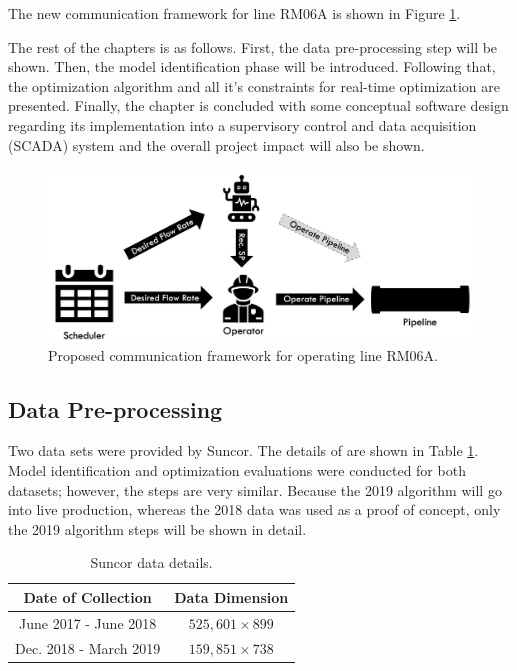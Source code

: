 The new communication framework for line RM06A is shown in Figure \ref{fig:08scheduleV2}.

The rest of the chapters is as follows.  First, the data pre-processing step will be shown.  Then, the model identification phase will be introduced.  Following that, the optimization algorithm and all it's constraints for real-time optimization are presented.  Finally, the chapter is concluded with some conceptual software design regarding its implementation into a supervisory control and data acquisition (SCADA) system and the overall project impact will also be shown.


\begin{figure}[h]
    \centering
    \includegraphics[scale=0.35]{images/08ScheduleV2.png}
    \caption{Proposed communication framework for operating line RM06A.}
    \label{fig:08scheduleV2}
\end{figure}

\subsection{Data Pre-processing}
Two data sets were provided by Suncor.  The details of are shown in Table \ref{tab:08data}. Model identification and optimization evaluations were conducted for both datasets; however, the steps are very similar.  Because the 2019 algorithm will go into live production, whereas the 2018 data was used as a proof of concept, only the 2019 algorithm steps will be shown in detail.

\begin{table}[h]
    \centering
    {
    \begin{tabular}{ c | c }
        Date of Collection     &      Data Dimension      \\
        \hline
        June 2017 - June 2018  &    $525,601 \times 899$   \\
        Dec. 2018 - March 2019 &    $159,851 \times 738$   \\
    \end{tabular}}
    \caption{Suncor data details.}
    \label{tab:08data}
\end{table}

